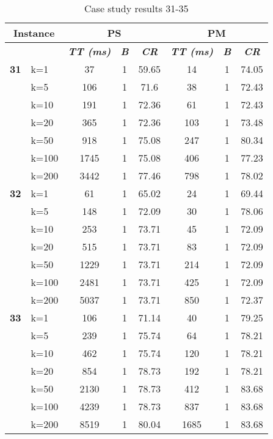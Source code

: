     \begin{table}[htbp]
    \caption{Case study results 31-35}
    \centering
    \begin{tabular}{|l|l|c|c|c|c|c|c|}
    \hline
    \multicolumn{ 2}{|c|}{\textbf{Instance}} & \multicolumn{ 3}{c|}{\textbf{PS}} & \multicolumn{ 3}{c|}{\textbf{PM}} \\ \hline
    \multicolumn{ 2}{|l|}{} & \textbf{\textit{TT (ms)}} & \textbf{\textit{B}} & \textbf{\textit{CR}} & \textbf{\textit{TT (ms)}} & \textbf{\textit{B}} & \textbf{\textit{CR}} \\ \hline
    \multicolumn{1}{|r|}{\textbf{31}} & k=1 & 37 & 1 & 59.65 & 14 & 1 & 74.05 \\ 
     & k=5 & 106 & 1 & 71.6 & 38 & 1 & 72.43 \\ 
     & k=10 & 191 & 1 & 72.36 & 61 & 1 & 72.43 \\ 
     & k=20 & 365 & 1 & 72.36 & 103 & 1 & 73.48 \\ 
     & k=50 & 918 & 1 & 75.08 & 247 & 1 & 80.34 \\ 
     & k=100 & 1745 & 1 & 75.08 & 406 & 1 & 77.23 \\ 
     & k=200 & 3442 & 1 & 77.46 & 798 & 1 & 78.02 \\ \hline
    \multicolumn{1}{|r|}{\textbf{32}} & k=1 & 61 & 1 & 65.02 & 24 & 1 & 69.44 \\ 
     & k=5 & 148 & 1 & 72.09 & 30 & 1 & 78.06 \\ 
     & k=10 & 253 & 1 & 73.71 & 45 & 1 & 72.09 \\ 
     & k=20 & 515 & 1 & 73.71 & 83 & 1 & 72.09 \\ 
     & k=50 & 1229 & 1 & 73.71 & 214 & 1 & 72.09 \\ 
     & k=100 & 2481 & 1 & 73.71 & 425 & 1 & 72.09 \\ 
     & k=200 & 5037 & 1 & 73.71 & 850 & 1 & 72.37 \\ \hline
    \multicolumn{1}{|r|}{\textbf{33}} & k=1 & 106 & 1 & 71.14 & 40 & 1 & 79.25 \\ 
     & k=5 & 239 & 1 & 75.74 & 64 & 1 & 78.21 \\ 
     & k=10 & 462 & 1 & 75.74 & 120 & 1 & 78.21 \\ 
     & k=20 & 854 & 1 & 78.73 & 192 & 1 & 78.21 \\ 
     & k=50 & 2130 & 1 & 78.73 & 412 & 1 & 83.68 \\ 
     & k=100 & 4239 & 1 & 78.73 & 837 & 1 & 83.68 \\ 
     & k=200 & 8519 & 1 & 80.04 & 1685 & 1 & 83.68 \\ \hline

\end{tabular}
\end{table}
